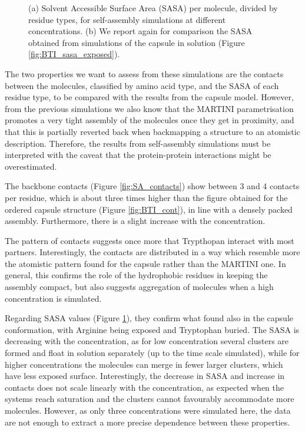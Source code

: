 \begin{figure}
\caption[(SI) Self-assembly simulations: SASA]{(a) Solvent Accessible Surface Area (SASA) per molecule, divided by residue types, for self-assembly simulations at different concentrations. (b) We report again for comparison the SASA obtained from simulations of the capsule in solution (Figure \ref{fig:BTI_sasa_exposed}).}
\label{fig:SA_sasa_all}
\end{figure}

The two properties we want to assess from these simulations are the contacts between the molecules, classified by amino acid type, and the SASA of each residue type, to be compared with the results from the capsule model. However, from the previous simulations we also know that the MARTINI parametrisation promotes a very tight assembly of the molecules once they get in proximity, and that this is partially reverted back when backmapping a structure to an atomistic description. Therefore, the results from self-assembly simulations must be interpreted with the caveat that the protein-protein interactions might be overestimated.

The backbone contacts (Figure \ref{fig:SA_contacts}) show between 3 and 4 contacts per residue, which is about three times higher than the figure obtained for the ordered capsule structure (Figure \ref{fig:BTI_cont}), in line with a densely packed assembly.
%
Furthermore, there is a slight increase with the concentration.

The pattern of contacts suggests once more that Trypthopan interact with most partners. Interestingly, the contacts are distributed in a way which resemble more the atomistic pattern found for the capsule rather than the MARTINI one. In general, this confirms the role of the hydrophobic residues in keeping the assembly compact, but also suggests aggregation of molecules when a high concentration is simulated.

Regarding SASA values (Figure \ref{fig:SA_sasa_all}), they confirm what found also in the capsule conformation, with Arginine being exposed and Tryptophan buried. The SASA is decreasing with the concentration, as for low concentration several clusters are formed and float in solution separately (up to the time scale simulated), while for higher concentrations the molecules can merge in fewer larger clusters, which have less exposed surface.
%
Interestingly, the decrease in SASA and increase in contacts does not scale linearly with the concentration, as expected when the systems reach saturation and the clusters cannot favourably accommodate more molecules. However, as only three concentrations were simulated here, the data are not enough to extract a more precise dependence between these properties.

